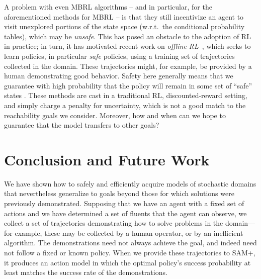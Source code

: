 \documentclass[letterpaper]{article} %
\begin{document}
A problem with even MBRL algorithms -- and in particular, for the aforementioned methods for MBRL -- is that they still incentivize an agent to visit unexplored portions of the state space (w.r.t.\ the conditional probability tables), which may be \emph{unsafe}. 
This has posed an obstacle to the adoption of RL in practice; in turn, it has motivated recent work on \emph{offline RL}~\cite{levine2020offline,kidambi2020morel,yu2020mopo}, which seeks to learn policies, in particular \emph{safe} policies, using a training set of trajectories collected in the domain. These trajectories might, for example, be provided by a human demonstrating good behavior. 
Safety here generally means that we guarantee with high probability that the policy will remain in some set of ``safe'' states \cite{thomas2015safe,thomas2019preventing}. These methods are cast in a traditional RL, discounted-reward setting, and simply charge a penalty for uncertainty, which is not a good match to the reachability goals we consider.
Moreover, how and when can we hope to guarantee that the model transfers to other goals? 




\section{Conclusion and Future Work}
We have shown how to safely and efficiently acquire models of stochastic domains that nevertheless generalize to goals beyond those for which solutions were previously demonstrated. Supposing that we have an agent with a fixed set of actions and we have determined a set of fluents that the agent can observe, we collect a set of trajectories demonstrating how to solve problems in the domain---for example, these may be collected by a human operator, or by an inefficient algorithm. The demonstrations need not always achieve the goal, and indeed need not follow a fixed or known policy. When we provide these trajectories to SAM+, it produces an action model in which the optimal policy's success probability at least matches the success rate of the demonstrations.
\end{document}
